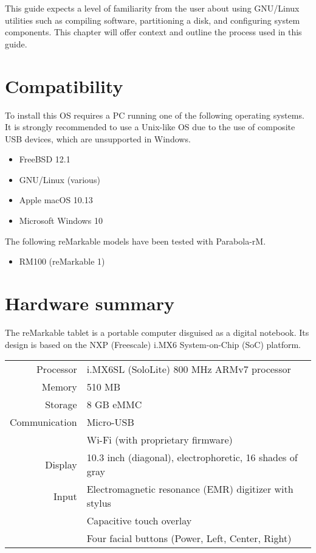 \documentclass{memoir}
\begin{document}
This guide expects a level of familiarity from the user about using GNU/Linux utilities such as compiling software, partitioning a disk, and configuring system components. This chapter will offer context and outline the process used in this guide.

\section{Compatibility}
To install this OS requires a PC running one of the following operating systems. It is strongly recommended to use a Unix-like OS due to the use of composite USB devices, which are unsupported in Windows.

\begin{itemize}
\item{FreeBSD 12.1}
\item{GNU/Linux (various)}
\item{Apple macOS 10.13}
\item{Microsoft Windows 10}
\end{itemize}

The following reMarkable models have been tested with Parabola-rM.

\begin{itemize}
\item{RM100 (reMarkable 1)}
\end{itemize}


\section{Hardware summary}
The reMarkable tablet is a portable computer disguised as a digital notebook. Its design is based on the NXP (Freescale) i.MX6 System-on-Chip (SoC) platform.

\vspace{0.5cm}
\begin{tabular}{ r | l }
  Processor & i.MX6SL (SoloLite) 800 MHz ARMv7 processor \\
  Memory & 510 MB \\
  Storage & 8 GB eMMC \\
  Communication & Micro-USB \\
  & Wi-Fi (with proprietary firmware)\\
  Display & 10.3 inch (diagonal), electrophoretic, 16 shades of gray \\
  Input & Electromagnetic resonance (EMR) digitizer with stylus \\
  & Capacitive touch overlay \\
  & Four facial buttons (Power, Left, Center, Right)
\end{tabular}
\end{document}
